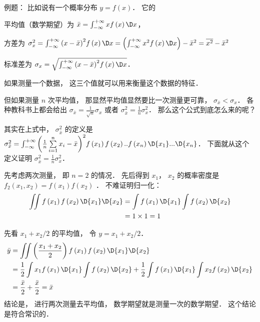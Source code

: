 
例题： 比如说有一个概率分布 $y = f\left( x \right)$．  它的

平均值（数学期望）为 $\bar x = \int_{ - \infty }^{ + \infty } {xf\left( x \right)\D x} $，  

方差为  $\sigma_x^2 = \int_{ - \infty }^{ + \infty } {{{\left( {x - \bar x} \right)}^2}f\left( x \right)\D x}  = \left( {\int_{ - \infty }^{ + \infty } {{x^2}f\left( x \right)\D x} } \right) - {\bar x^2} = \overline {{x^2}}  - {\bar x^2}$ 

标准差为 ${\sigma_x} = \sqrt {\int_{ - \infty }^{ + \infty } {{{\left( {x - \bar x} \right)}^2}f\left( x \right)\D x} } $．  

如果测量一个数据， 这三个值就可以用来衡量这个数据的特征．

但如果测量 $n$ 次平均值， 那显然平均值显然要比一次测量更可靠， ${\sigma_{\bar x}} < {\sigma_x}$．   各种教科书上都会给出 ${\sigma_{\bar x}} = \frac{1}{{\sqrt n }}{\sigma_x}$ 或者 $\sigma_{\bar x}^2 = \frac{1}{n}\sigma_x^2$．  那么这个公式到底怎么来的呢？

其实在上式中， $\sigma_{\bar x}^2$  的定义是 $\sigma_{\bar x}^2 = \int_{ - \infty }^{ + \infty } {{{\left( {\frac{1}{n}\sum\limits_{i = 1}^n {{x_i}}  - \bar x} \right)}^2}f\left( {{x_1}} \right)f\left( {{x_2}} \right)..f\left( {{x_n}} \right)\D {x_1}...\D {x_n}} $．  下面就从这个定义证明 $\sigma_{\bar x}^2 = \frac{1}{n}\sigma_x^2$． 

先考虑两次测量， 即 $n = 2$ 的情况． 先后得到 ${x_1}$，  ${x_2}$ 的概率密度是 ${f_2}\left( {{x_1},{x_2}} \right) = f\left( {{x_1}} \right)f\left( {{x_2}} \right)$ 
．  不难证明归一化：
 \begin{equation}
\begin{aligned}
  \iint {f\left( {x_1} \right)f\left( {x_2} \right)\D {x_1}\D {x_2}} &= \int {f\left( {x_1} \right)\D {x_1}} \int {f\left( {x_2} \right)\D {x_2}}  \hfill \\
   &= 1 \times 1 = 1 \hfill \\ 
\end{aligned}
\end{equation}

先看 ${{{x_1} + {x_2}}}/{2}$ 的平均值， 令 $y = {{{x_1} + {x_2}}}/{2}$． 
  \begin{equation}
\begin{aligned}
  \bar y &= \iint {\left( {\frac{{x_1} + {x_2}}{2}} \right)f\left( {x_1} \right)f\left( {x_2} \right)\D {x_1}\D {x_2}} \hfill \\
  & = \frac{1}{2}\int {{x_1}f\left( {x_1} \right)\D {x_1}} \int {f\left( {x_2} \right)\D {x_2}}  + \frac{1}{2}\int {f\left( {x_1} \right)\D {x_1}} \int {{x_2}f\left( {x_2} \right)\D {x_2}}  \hfill \\
   &= \frac{\bar x}{2} + \frac{\bar x}{2} = \bar x \hfill \\ 
\end{aligned} 
\end{equation}
结论是， 进行两次测量去平均值， 数学期望就是测量一次的数学期望． 这个结论是符合常识的．

